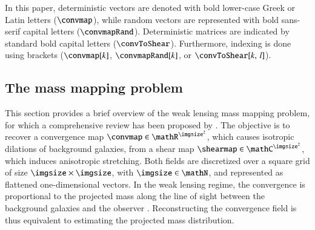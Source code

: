 \documentclass{aa}
\begin{document}
In this paper, deterministic vectors are denoted with bold lower-case Greek or Latin letters ($\convmap$), while random vectors are represented with bold sans-serif capital letters ($\convmapRand$). Deterministic matrices are indicated by standard bold capital letters ($\convToShear$). Furthermore, indexing is done using brackets ($\convmap[k]$,  $\convmapRand[k]$, or $\convToShear[k,\, l]$).

\subsection{The mass mapping problem}
\label{subsec:background_mm}

This section provides a brief overview of the weak lensing mass mapping problem, for which a comprehensive review has been proposed by \citet{Kilbinger2015}. The objective is to recover a convergence map $\convmap \in \mathR^{\imgsize^2}$, which causes isotropic dilations of background galaxies, from a shear map $\shearmap \in \mathC^{\imgsize^2}$, which induces anisotropic stretching. Both fields are discretized over a square grid of size $\imgsize \times \imgsize$, with $\imgsize \in \mathN$, and represented as flattened one-dimensional vectors. In the weak lensing regime, the convergence is proportional to the projected mass along the line of sight between the background galaxies and the observer \citep{Kaiser1993}. Reconstructing the convergence field is thus equivalent to estimating the projected mass distribution.
\end{document}
